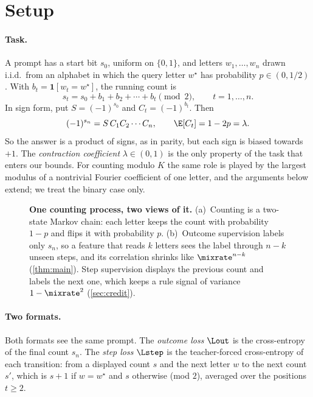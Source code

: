 \section{Setup}
\label{sec:setup}
\label{sec:setting}

\paragraph{Task.} A prompt has a start bit $s_0$, uniform on $\{0,1\}$, and letters $w_1,\ldots,w_n$ drawn
i.i.d.\ from an alphabet in which the query letter $w^\star$ has probability $p\in(0,1/2)$. With
$b_t=\mathbf 1[w_t=w^\star]$, the running count is
\[
 s_t=s_0+b_1+b_2+\cdots+b_t\pmod 2,\qquad t=1,\ldots,n .
\]
In sign form, put $S=(-1)^{s_0}$ and $C_t=(-1)^{b_t}$. Then
\begin{equation}
 (-1)^{s_n}=S\,C_1C_2\cdots C_n,\qquad \E[C_t]=1-2p=\lambda .
 \label{eq:tracking}
\end{equation}
So the answer is a product of signs, as in parity, but each sign is biased towards $+1$. The
\emph{contraction coefficient} $\lambda\in(0,1)$ is the only property of the task that enters our
bounds. For counting modulo $K$ the same role is played by the largest modulus of a nontrivial
Fourier coefficient of one letter, and the arguments below extend; we treat the binary case only.

\begin{figure}[t]
\centering
\resizebox{\linewidth}{!}{}
\caption{\textbf{One counting process, two views of it.}
(a)~Counting is a two-state Markov chain: each letter keeps the count with probability $1-p$ and flips it with probability $p$.
(b)~Outcome supervision labels only $s_n$, so a feature that reads $k$ letters sees the label through
$n-k$ unseen steps, and its correlation shrinks like $\mixrate^{n-k}$ (\cref{thm:main}). Step supervision
displays the previous count and labels the next one, which keeps a rule signal of variance $1-\mixrate^2$
(\cref{sec:credit}).}
\label{fig:chain}
\end{figure}

\paragraph{Two formats.} Both formats see the same prompt. The \emph{outcome loss} $\Lout$ is the
cross-entropy of the final count $s_n$. The \emph{step loss} $\Lstep$ is the teacher-forced cross-entropy of
each transition: from a displayed count $s$ and the next letter $w$ to the next count $s'$, which is $s+1$ if $w=w^\star$
and $s$ otherwise (mod $2$), averaged over the positions $t\ge2$.

